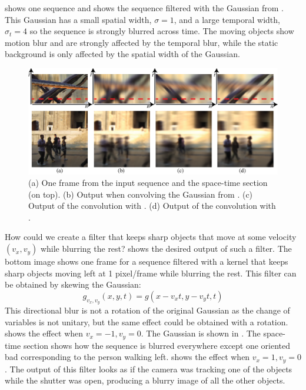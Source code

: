  shows one sequence and  shows the sequence filtered with the Gaussian from . This Gaussian has a small spatial width, $\sigma=1$, and a large temporal width, $\sigma_t=4$ so the sequence is strongly blurred across time. The moving objects show motion blur and are strongly affected by the temporal blur, while the static background is only affected by the spatial width of the Gaussian.


\begin{figure}[t]
\includegraphics[width=1\linewidth]{figures/temporal_filters/seq_filtered_blur.eps}
\caption{(a) One frame from the input sequence and the space-time section (on top). (b) Output when convolving the Gaussian from . (c) Output of the convolution with . (d) Output of the convolution with .} 
\label{fig:sec_filtered_blur}
\end{figure}

How could we create a filter that keeps sharp objects that move at some velocity $(v_x,v_y)$ while blurring the rest?  shows the desired output of such a filter. The bottom image shows one frame for a sequence filtered with a kernel that keeps sharp objects moving left at 1 pixel/frame while blurring the rest. This filter can be obtained by skewing the Gaussian:
\begin{equation}
g_{v_x,v_y}(x,y,t) = g(x - v_xt,y - v_yt, t) 
\end{equation}
This directional blur is not a rotation of the original Gaussian as the change of variables is not unitary, but the same effect could be obtained with a rotation.  shows the effect when $v_x=-1, v_y=0$. The Gaussian is shown in . The space-time section shows how the sequence is blurred everywhere except one oriented bad corresponding to the person walking left.  shows the effect when $v_x=1, v_y=0$. The output of this filter looks as if the camera was tracking one of the objects while the shutter was open, producing a blurry image of all the other objects.



